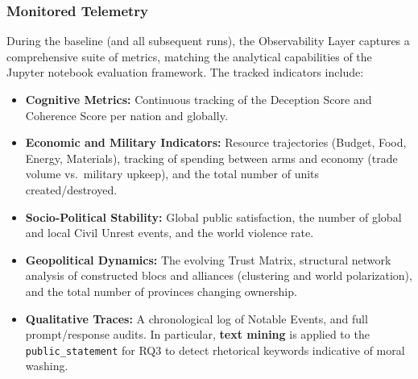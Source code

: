 \subsubsection*{Monitored Telemetry}
During the baseline (and all subsequent runs), the Observability Layer captures a comprehensive suite of metrics, matching the analytical capabilities of the Jupyter notebook evaluation framework. The tracked indicators include:
\begin{itemize}
    \item \textbf{Cognitive Metrics:} Continuous tracking of the Deception Score and Coherence Score per nation and globally.
    \item \textbf{Economic and Military Indicators:} Resource trajectories (Budget, Food, Energy, Materials), tracking of spending between arms and economy (trade volume vs.\ military upkeep), and the total number of units created/destroyed.
    \item \textbf{Socio-Political Stability:} Global public satisfaction, the number of global and local Civil Unrest events, and the world violence rate.
    \item \textbf{Geopolitical Dynamics:} The evolving Trust Matrix, structural network analysis of constructed blocs and alliances (clustering and world polarization), and the total number of provinces changing ownership.
    \item \textbf{Qualitative Traces:} A chronological log of Notable Events, and full prompt/response audits. In particular, \textbf{text mining} is applied to the \texttt{public\_statement} for RQ3 to detect rhetorical keywords indicative of moral washing.
\end{itemize}

